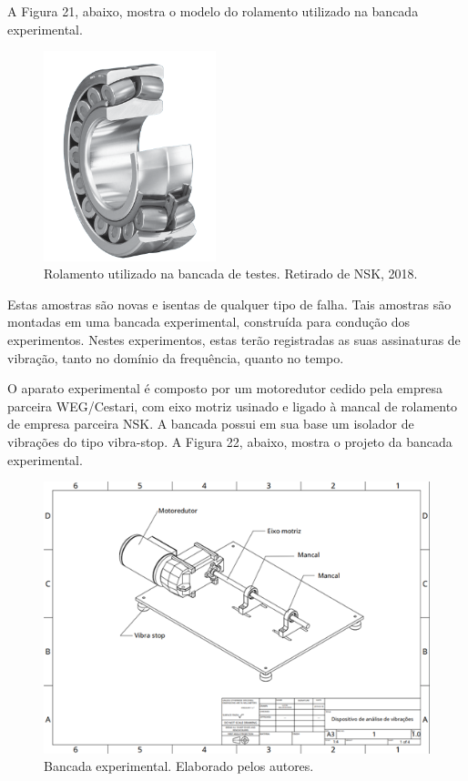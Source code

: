 \documentclass[
	12pt,				
	oneside,			
	a4paper,			
	english,			
	brazil				
	]{abntex2ppgsi}
\begin{document}
A Figura 21, abaixo, mostra o modelo do rolamento utilizado na bancada experimental.

\begin{figure}[!htb]
\centering
\includegraphics[width=50mm]{Figura24}
\caption {Rolamento utilizado na bancada de testes. Retirado de NSK, 2018.}
\label{Figura24}
\end{figure} 

Estas amostras são novas e isentas de qualquer tipo de falha. Tais amostras são montadas em uma bancada experimental, construída para condução dos experimentos. Nestes experimentos, estas terão registradas as suas assinaturas de vibração, tanto no domínio da frequência, quanto no tempo. 

O aparato experimental é composto por um motoredutor cedido pela empresa parceira WEG/Cestari, com eixo motriz usinado e ligado à mancal de rolamento de empresa parceira NSK. A bancada possui em sua base um isolador de vibrações do tipo vibra-stop. A Figura 22, abaixo, mostra o projeto da bancada experimental.

\begin{figure}[!htb]
\centering
\includegraphics{Figura22}
\caption {Bancada experimental. Elaborado pelos autores.}
\label{Figura22}
\end{figure} 
\end{document}
